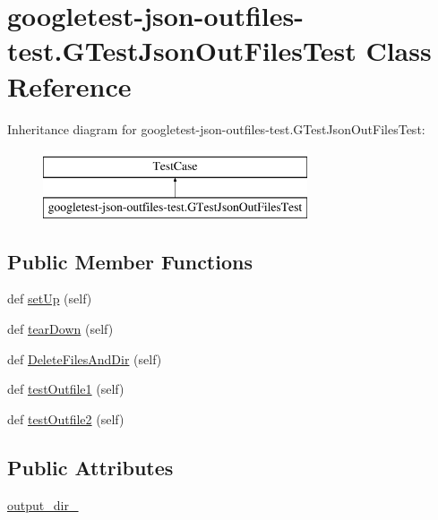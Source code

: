 \hypertarget{classgoogletest-json-outfiles-test_1_1GTestJsonOutFilesTest}{}\section{googletest-\/json-\/outfiles-\/test.G\+Test\+Json\+Out\+Files\+Test Class Reference}
\label{classgoogletest-json-outfiles-test_1_1GTestJsonOutFilesTest}
Inheritance diagram for googletest-\/json-\/outfiles-\/test.G\+Test\+Json\+Out\+Files\+Test\+:\begin{figure}[H]
\begin{center}
\leavevmode
\includegraphics[height=2.000000cm]{classgoogletest-json-outfiles-test_1_1GTestJsonOutFilesTest}
\end{center}
\end{figure}
\subsection*{Public Member Functions}
\begin{DoxyCompactItemize}
\item 
def \mbox{\hyperlink{classgoogletest-json-outfiles-test_1_1GTestJsonOutFilesTest_a4d377334ff0527f037a83158faf9f92f}{set\+Up}} (self)
\item 
def \mbox{\hyperlink{classgoogletest-json-outfiles-test_1_1GTestJsonOutFilesTest_a26ac17ebec0c197135a217794e11ce58}{tear\+Down}} (self)
\item 
def \mbox{\hyperlink{classgoogletest-json-outfiles-test_1_1GTestJsonOutFilesTest_a382ecae11a217d1a972d694996485e4b}{Delete\+Files\+And\+Dir}} (self)
\item 
def \mbox{\hyperlink{classgoogletest-json-outfiles-test_1_1GTestJsonOutFilesTest_a3efb5b896cde155ecbc766432acd81ec}{test\+Outfile1}} (self)
\item 
def \mbox{\hyperlink{classgoogletest-json-outfiles-test_1_1GTestJsonOutFilesTest_a4ab6e77d7eb415cb339b42e9273730b7}{test\+Outfile2}} (self)
\end{DoxyCompactItemize}
\subsection*{Public Attributes}
\begin{DoxyCompactItemize}
\item 
\mbox{\hyperlink{classgoogletest-json-outfiles-test_1_1GTestJsonOutFilesTest_a18e262639002fb485155961593efad20}{output\+\_\+dir\+\_\+}}
\end{DoxyCompactItemize}



